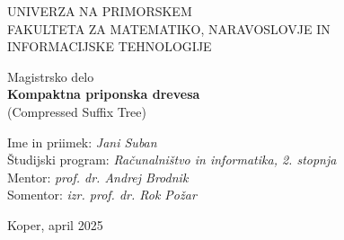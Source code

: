 \documentclass[12pt,a4paper,titlepage,openany,twoside]{report}
\begin{document}
\pagestyle{empty}
\begin{center}
\noindent \large UNIVERZA NA PRIMORSKEM\\
\large FAKULTETA ZA MATEMATIKO, NARAVOSLOVJE IN\\
INFORMACIJSKE TEHNOLOGIJE


\normalsize
\vspace{6cm}
Magistrsko delo\\
\textbf{\large Kompaktna priponska drevesa}\\ %
\normalsize
(Compressed Suffix Tree)\\ %
\end{center}

\begin{flushleft}
\vspace{5cm}
\noindent Ime in priimek: \textit{Jani Suban}
\\
\noindent Študijski program: \textit{Računalništvo in informatika, 2. stopnja}
\\
\noindent Mentor: \textit{prof. dr. Andrej Brodnik}
\\
\noindent Somentor: \textit{izr. prof. dr. Rok Požar}
\\

\end{flushleft}

\vspace{4cm}
\begin{center}
\large {Koper, april 2025} %
\end{center}
\newpage

\pagestyle{fancy}
\end{document}
